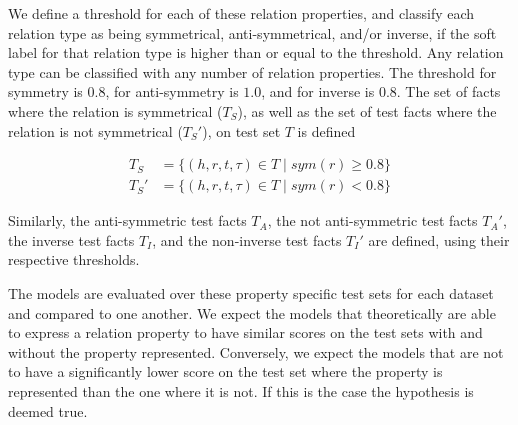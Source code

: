 

We define a threshold for each of these relation properties, and classify each relation type as being symmetrical, anti-symmetrical, and/or inverse, if the soft label for that relation type is higher than or equal to the threshold. Any relation type can be classified with any number of relation properties. The threshold for symmetry is $0.8$, for anti-symmetry is $1.0$, and for inverse is $0.8$.
The set of facts where the relation is symmetrical ($T_S$), as well as the set of test facts where the relation is not symmetrical ($T_S'$), on test set $T$ is defined

\begin{equation}
\begin{aligned}
T_S & = \{ (h, r, t, \tau) \in T \mid \mathit{sym}(r) \geq 0.8 \}\\
T_S' & = \{ (h, r, t, \tau) \in T \mid \mathit{sym}(r) < 0.8 \}
\end{aligned}
\end{equation}

\noindent
Similarly, the anti-symmetric test facts $T_A$, the not anti-symmetric test facts $T_A'$, the inverse test facts $T_I$, and the non-inverse test facts $T_I'$ are defined, using their respective thresholds.

The models are evaluated over these property specific test sets for each dataset and compared to one another. 
We expect the models that theoretically are able to express a relation property to have similar scores on the test sets with and without the property represented.
Conversely, we expect the models that are not to have a significantly lower score on the test set where the property is represented than the one where it is not.
If this is the case the hypothesis is deemed true.